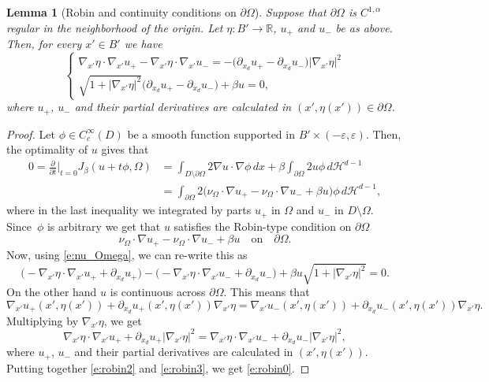 \documentclass[11pt]{article}
\numberwithin{equation}{section}
\theoremstyle{plain}
\newtheorem{lemma}[teo]{Lemma}
\theoremstyle{definition}
\let\eps\varepsilon
\def\R{\mathbb{R}}
\def\HH{\mathcal{H}}
\begin{document}
\begin{lemma}[Robin and continuity conditions on $\partial\Omega$]\label{l:robin_condition}
Suppose that $\partial\Omega$ is $C^{1,\alpha}$ regular in the neighborhood of the origin. Let $\eta:B'\to\R$, $u_+$ and $u_-$ be as above. Then, for every $x'\in B'$ we have
\begin{equation}\label{e:robin0}
\begin{cases}
\nabla_{\!x'}\eta\cdot \nabla_{\!x'}u_+-\nabla_{\!x'}\eta\cdot \nabla_{\!x'}u_-=-\big(\partial_{x_d}u_+-\partial_{x_d}u_-\big)|\nabla_{\!x'}\eta|^2\\
\sqrt{1+|\nabla_{\!x'}\eta|^2}\big(\partial_{x_d}u_+-\partial_{x_d}u_-\big)+\beta u=0,
\end{cases}
\end{equation}
where $u_+$, $u_-$ and their partial derivatives are calculated in $(x',\eta(x'))\in \partial\Omega$.
\end{lemma}
\begin{proof}
Let $\phi\in C^{\infty}_c(D)$ be a smooth function supported in $B'\times(-\eps,\eps)$.
Then, the optimality of $u$ gives that
\begin{align*}
0=\frac{\partial}{\partial t}\Big\vert_{t=0}J_\beta(u+t\phi,\Omega)&=\int_{D\setminus\partial\Omega}2\nabla u\cdot\nabla \phi\,dx+\beta\int_{\partial\Omega}2u\phi\,d\HH^{d-1}\\
&=\int_{\partial\Omega}2\big(\nu_\Omega\cdot\nabla u_+-\nu_\Omega\cdot\nabla u_-+\beta u\big)\phi\,d\HH^{d-1},
\end{align*}
where in the last inequality we integrated by parts $u_+$ in $\Omega$ and $u_-$ in $D\setminus\Omega$.
Since~$\phi$ is arbitrary we get that $u$ satisfies the Robin-type condition on $\partial\Omega$
\begin{equation}%
\nu_\Omega\cdot\nabla u_+-\nu_\Omega\cdot\nabla u_-+\beta u\quad\text{on}\quad \partial\Omega.
\end{equation}
Now, using \eqref{e:nu_Omega}, we can re-write this as
\begin{equation}\label{e:robin2}
\big(-\nabla_{\!x'}\eta\cdot\nabla_{\!x'}u_++\partial_{x_d}u_+\big)-\big(-\nabla_{\!x'}\eta\cdot\nabla_{\!x'}u_-+\partial_{x_d}u_-\big)+\beta u \sqrt{1+|\nabla_{\!x'}\eta|^2}=0.
\end{equation}
On the other hand $u$ is continuous across $\partial\Omega$. This means that
\[\nabla_{\!x'}u_+(x',\eta(x'))+\partial_{x_d}u_+(x',\eta(x'))\nabla_{\!x'}\eta=\nabla_{\!x'}u_-(x',\eta(x'))+\partial_{x_d}u_-(x',\eta(x'))\nabla_{\!x'}\eta.\]
Multiplying by $\nabla_{\!x'}\eta$, we get
\begin{equation}\label{e:robin3}
\nabla_{\!x'}\eta\cdot \nabla_{\!x'}u_++\partial_{x_d}u_+|\nabla_{\!x'}\eta|^2=\nabla_{\!x'}\eta\cdot \nabla_{\!x'}u_-+\partial_{x_d}u_-|\nabla_{\!x'}\eta|^2,
\end{equation}
where $u_+$, $u_-$ and their partial derivatives are calculated in $(x',\eta(x'))$. Putting together \eqref{e:robin2} and \eqref{e:robin3}, we get \eqref{e:robin0}.
\end{proof}
\end{document}
